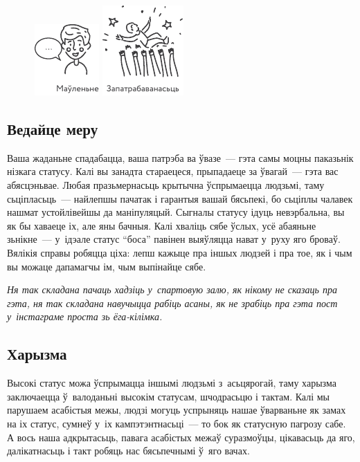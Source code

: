 \begin{figure}[htb!]
  \centering
  \includegraphics[scale=1.5]{willpower/ch9/8.pdf}\qquad
  \includegraphics[scale=1.5]{willpower/ch9/9.pdf}
\end{figure}

\subsection*{Ведайце меру}

Ваша жаданьне спадабацца, ваша патрэба ва ўвазе~--- гэта самы моцны паказьнік нізкага статусу. Калі вы занадта стараецеся, прыпадаеце за ўвагай~--- гэта вас абясцэньвае. Любая празьмернасьць крытычна ўспрымаецца людзьмі, таму сьціпласьць~--- найлепшы пачатак і гарантыя вашай бясьпекі, бо сьціплы чалавек нашмат устойлівейшы да маніпуляцый. Сыгналы статусу ідуць невэрбальна, вы як бы хаваеце іх, але яны бачныя. Калі хваліць сябе ўслых, усё абаяньне зьнікне~--- у~ідэале статус ``боса'' павінен выяўляцца нават у~руху яго броваў. Вялікія справы робяцца ціха: лепш кажыце пра іншых людзей і пра тое, як і чым вы можаце дапамагчы ім, чым выпінайце сябе.

\emph{Ня так складана пачаць хадзіць у~спартовую залю, як нікому не сказаць пра гэта, ня так складана навучыцца рабіць асаны, як не зрабіць пра гэта пост у~інстаграме проста зь ёга-кілімка.}

\subsection*{Харызма}

Высокі статус можа ўспрымацца іншымі людзьмі з~асьцярогай, таму харызма заключаецца ў~валоданьні высокім статусам, шчодрасьцю і тактам. Калі мы парушаем асабістыя межы, людзі могуць успрыняць нашае ўварваньне як замах на іх статус, сумнеў у~іх кампэтэнтнасьці~--- то бок як статусную пагрозу сабе. А вось наша адкрытасьць, павага асабістых межаў суразмоўцы, цікавасьць да яго, далікатнасьць і такт робяць нас бясьпечнымі ў~яго вачах.

